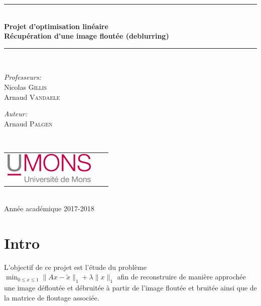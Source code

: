 \documentclass[a4paper, 12pt]{article}
\begin{document}
\begin{titlepage}
\begin{center}

\newcommand{\HRule}{\rule{\linewidth}{0.3mm}}
\HRule \\[0.3cm]
{ \LARGE \bfseries Projet d’optimisation linéaire \\[0.3cm]}
{ \LARGE \bfseries Récupération d’une image floutée (deblurring) \\[0.1cm]} %
\HRule \\[1.5cm]

\begin{minipage}[t]{0.45\textwidth}
\begin{flushleft} \large
\emph{Professeurs:}\\
Nicolas \textsc{Gillis}\\
Arnaud \textsc{Vandaele}
\end{flushleft}
\end{minipage}
\begin{minipage}[t]{0.45\textwidth}
\begin{flushright} \large
\emph{Auteur:} \\
Arnaud \textsc{Palgen}
\end{flushright}
\end{minipage}\\[2ex]

\vfill

\begin{center}
\begin{tabular}[t]{c c c}
\includegraphics[height=1.5cm]{logoumons.jpg} &
\hspace{0.3cm} &
\end{tabular}
\end{center}~\\
 
{\large Année académique 2017-2018}

\end{center}
\end{titlepage}
\newpage
\section{Intro}
L'objectif de ce projet est l'étude du problème $\min_{0 \le x \le 1} \| Ax-\tilde{x} \|_1 + \lambda \| x \|_1$ afin de reconstruire de manière approchée une image défloutée et débruitée à partir de l'image floutée et bruitée ainsi que de la matrice de floutage associée.
\end{document}

